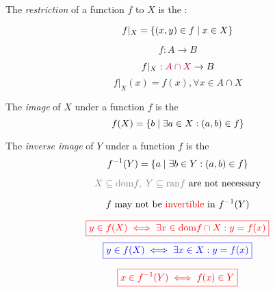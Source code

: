 
\begin{frame}{}
  \begin{definition}[Restriction]
    The {\it restriction} of a function $f$ to $X$ is the :

    \[
      f|_{X} = \{(x, y) \in f \mid x \in X\}
    \]
  \end{definition}

  \pause
  \[
    f: A \to B
  \]

  \pause
  \[
    f|_{X}: \textcolor{purple}{A \cap X} \to B
  \]
  \[
    f|_{X}(x) = f(x), \forall x \in A \cap X
  \]
\end{frame}

\begin{frame}{}
  \begin{definition}[Image]
    The {\it image} of $X$ under a function $f$ is the 
    \[
      {f(X) = \{b \mid \exists a \in X: (a, b) \in f\}}
    \]
  \end{definition}

  \vspace{0.50cm}
  \begin{definition}
    The {\it inverse image} of $Y$ under a function $f$ is the 
    \[
      {f^{-1}(Y) = \{a \mid \exists b \in Y: (a, b) \in f\}}
    \]
  \end{definition}

  \pause
  \[
    \textcolor{gray}{X \subseteq \dom{f},\; Y \subseteq \ran{f}} \text{ are not necessary}
  \]

  \pause
  \[
    f \text{ may not be \textcolor{red}{invertible} in } f^{-1}(Y)
  \]
\end{frame}

\begin{frame}{}
  \[
    \textcolor{red}{\boxed{y \in f(X) \iff \exists x \in \text{dom}{f} \cap X: y = f(x)}}
  \]
  \[
    \textcolor{blue}{\boxed{y \in f(X) \iff \exists x \in X: y = f(x)}}
  \]

  \vspace{0.60cm}
  \[
    \textcolor{red}{\boxed{x \in f^{-1}(Y) \iff f(x) \in Y}}
  \]
\end{frame}

